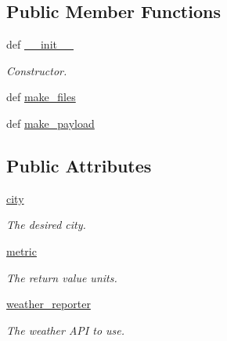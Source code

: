 \subsection*{Public Member Functions}
\begin{DoxyCompactItemize}
\item 
def \hyperlink{classRappCloud_1_1CloudMsgs_1_1WeatherReportForecast_1_1WeatherReportForecast_1_1Request_a4e35cf2b3c01fadf79268f22a841a4f4}{\-\_\-\-\_\-init\-\_\-\-\_\-}
\begin{DoxyCompactList}\small\item\em Constructor. \end{DoxyCompactList}\item 
def \hyperlink{classRappCloud_1_1CloudMsgs_1_1WeatherReportForecast_1_1WeatherReportForecast_1_1Request_aab81f9b941ac4e5f18440c724367b4c5}{make\-\_\-files}
\item 
def \hyperlink{classRappCloud_1_1CloudMsgs_1_1WeatherReportForecast_1_1WeatherReportForecast_1_1Request_a502f3c2227dc5247cb2da493be2b0b2c}{make\-\_\-payload}
\end{DoxyCompactItemize}
\subsection*{Public Attributes}
\begin{DoxyCompactItemize}
\item 
\hyperlink{classRappCloud_1_1CloudMsgs_1_1WeatherReportForecast_1_1WeatherReportForecast_1_1Request_a2499d14125eec3f59a8e35606105791c}{city}
\begin{DoxyCompactList}\small\item\em The desired city. \end{DoxyCompactList}\item 
\hyperlink{classRappCloud_1_1CloudMsgs_1_1WeatherReportForecast_1_1WeatherReportForecast_1_1Request_a2d4f2b9136975273b833f7306203cea7}{metric}
\begin{DoxyCompactList}\small\item\em The return value units. \end{DoxyCompactList}\item 
\hyperlink{classRappCloud_1_1CloudMsgs_1_1WeatherReportForecast_1_1WeatherReportForecast_1_1Request_a2101fc3bd266a689b7e7430fb349afc9}{weather\-\_\-reporter}
\begin{DoxyCompactList}\small\item\em The weather A\-P\-I to use. \end{DoxyCompactList}\end{DoxyCompactItemize}



